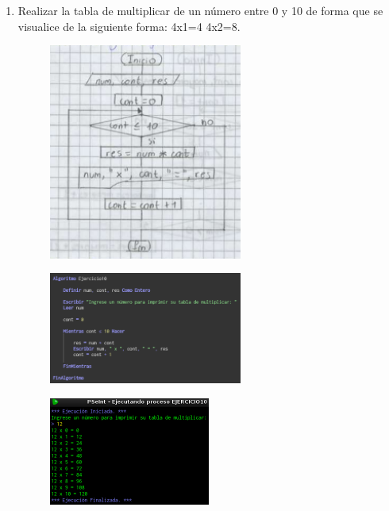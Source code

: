 \documentclass[12pt]{article}
\begin{document}
\begin{enumerate}
            \newpage
            \item Realizar la tabla de multiplicar de un número entre 0 y 10 de forma que se visualice de la siguiente forma: 4x1=4 4x2=8.
        
                \begin{figure}[!h]
                    \centering
                    \includegraphics[width=0.6\textwidth]{Img/DF_ej10.png}
                \end{figure}

                \begin{figure}[!h]
                    \centering
                    \includegraphics[width=0.6\textwidth]{Img/Cod_ej10.png}
                \end{figure}

                \begin{figure}[!h]
                    \centering
                    \includegraphics[width=0.5\textwidth]{Img/Ejec_ej10.png}
                \end{figure}


\end{enumerate}
\end{document}
